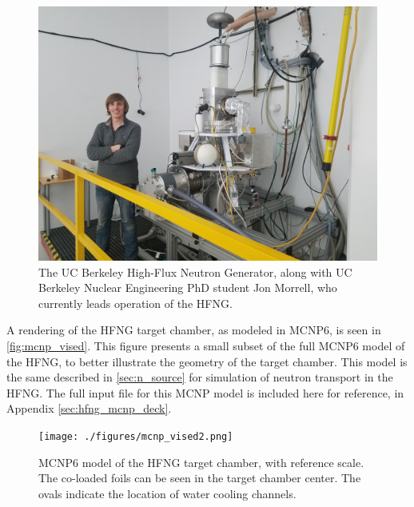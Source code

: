 \begin{figure}
 \centering
 \includegraphics[width=0.75\columnwidth]{./figures/new_hfng_photo.jpg}
 \caption{The UC Berkeley High-Flux Neutron Generator, along with  UC Berkeley Nuclear Engineering PhD student Jon Morrell, who currently leads operation of the HFNG.}
 \label{fig:alt_HFNG}
\end{figure}


A rendering of the HFNG target chamber, as modeled in MCNP6, is seen in \autoref{fig:mcnp_vised}.
This figure presents a small subset of the full MCNP6 model of the HFNG,  to better illustrate the geometry of the target chamber.
This model is the same described in \autoref{sec:n_source} for simulation of neutron transport in the HFNG.
The full input file for this MCNP model is included here for reference, in Appendix \ref{sec:hfng_mcnp_deck}.







\begin{figure}
 \centering
 \texttt{[image: ./figures/mcnp\_vised2.png]}
 \caption{MCNP6 model of the HFNG target chamber, with reference scale. The co-loaded foils can be seen in the target chamber center.  The ovals indicate the location of water cooling channels.}
 \label{fig:mcnp_vised}
\end{figure}






